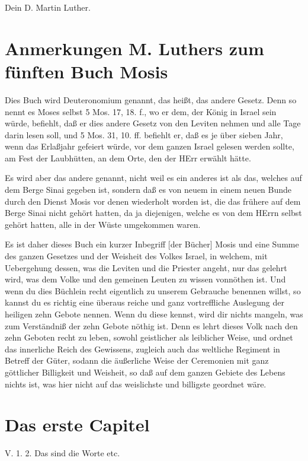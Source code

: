 Dein D. Martin Luther.

\section{Anmerkungen M. Luthers zum fünften Buch Mosis}

Dies Buch wird Deuteronomium genannt, das heißt, das andere Gesetz. Denn so nennt es Moses selbst 5 Mos. 17, 18. f., wo er dem, der König in Israel sein würde, befiehlt, daß er dies andere Gesetz von den Leviten nehmen und alle Tage darin lesen soll, und 5 Mos. 31, 10. ff. befiehlt er, daß es je über sieben Jahr, wenn das Erlaßjahr gefeiert würde, vor dem ganzen Israel gelesen werden sollte, am Fest der Laubhütten, an dem Orte, den der HErr erwählt hätte.

Es wird aber das andere genannt, nicht weil es ein anderes ist als das, welches auf dem Berge Sinai gegeben ist, sondern daß es von neuem in einem neuen Bunde durch den Dienst Mosis vor denen wiederholt worden ist, die das frühere auf dem Berge Sinai nicht gehört hatten, da ja diejenigen, welche es von dem HErrn selbst gehört hatten, alle in der Wüste umgekommen waren.

Es ist daher dieses Buch ein kurzer Inbegriff [der Bücher] Mosis und eine Summe des ganzen Gesetzes und der Weisheit des Volkes Israel, in welchem, mit Uebergehung dessen, was die Leviten und die Priester angeht, nur das gelehrt wird, was dem Volke und den gemeinen Leuten zu wissen vonnöthen ist. Und wenn du dies Büchlein recht eigentlich zu unserem Gebrauche benennen willst, so kannst du es richtig eine überaus reiche und ganz vortreffliche Auslegung der heiligen zehn Gebote nennen. Wenn du diese kennst, wird dir nichts mangeln, was zum Verständniß
der zehn Gebote nöthig ist. Denn es lehrt dieses Volk nach den zehn Geboten recht zu leben, sowohl geistlicher als leiblicher Weise, und ordnet das innerliche Reich des Gewissens, zugleich auch das weltliche Regiment in Betreff der Güter, sodann die äußerliche Weise der Ceremonien mit ganz göttlicher Billigkeit und Weisheit, so daß auf dem ganzen Gebiete des Lebens nichts ist, was hier nicht auf das weislichste und billigste geordnet wäre.

\section{Das erste Capitel}

\begin{schriftzitat}
V. 1. 2. Das sind die Worte etc.
\end{schriftzitat}

